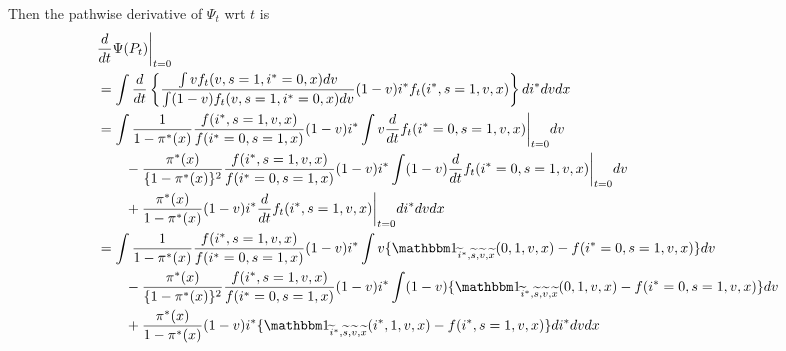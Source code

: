 \documentclass{article}
\begin{document}
Then the pathwise derivative of $\Psi_t$ wrt $t$ is
\begin{align*}
   &\frac{d}{dt} \Psi(P_t)\bigg\vert_{t=0} \\
   &= \int \frac{d}{dt} \left\{\dfrac{\int v f_t(v, s=1, i^*=0, x)dv}{\int (1-v) f_t(v, s=1, i^*=0, x)dv} (1 - v)i^*f_t(i^*, s=1, v, x) \right\} di^* dv dx \\
   &= \int \dfrac{1}{1-\pi^*(x)} \dfrac{f(i^*, s=1, v, x)}{f(i^*=0, s=1, x)} (1 - v)i^* \int v \frac{d}{dt} f_t(i^*=0, s=1,v,x) \bigg\vert_{t=0} dv \\
   &\qquad - \dfrac{\pi^*(x)}{\{1 - \pi^*(x)\}^2} \dfrac{f(i^*, s=1, v, x)}{f(i^*=0, s=1, x)} (1 - v)i^* \int (1-v) \frac{d}{dt}f_t(i^*=0, s=1, v, x) \bigg\vert_{t=0} dv \\
   &\qquad + \dfrac{\pi^*(x)}{1-\pi^*(x)} (1 - v)i^* \frac{d}{dt} f_t(i^*, s=1, v, x) \bigg\vert_{t=0} di^*dvdx \\
   &= \int  \dfrac{1}{1-\pi^*(x)} \dfrac{f(i^*, s=1, v, x)}{f(i^*=0, s=1, x)} (1 - v)i^* \int v \{ \mathbbm 1_{\widetilde i^*, \widetilde s, \widetilde v, \widetilde x}(0, 1, v, x) - f(i^*=0, s=1,v,x) \} dv \\
   &\qquad -\dfrac{\pi^*(x)}{\{1 - \pi^*(x)\}^2} \dfrac{f(i^*, s=1, v, x)}{f(i^*=0, s=1, x)} (1 - v)i^* \int (1 - v) \{\mathbbm 1_{\widetilde i^*, \widetilde s, \widetilde v, \widetilde x}(0, 1, v, x) - f(i^*=0, s=1, v, x) \} dv \\
   &\qquad + \dfrac{\pi^*(x)}{1-\pi^*(x)} (1 - v)i^* \{\mathbbm 1_{\widetilde i^*, \widetilde s, \widetilde v, \widetilde x}(i^*, 1, v, x) - f(i^*, s=1,v,x)\} di^*dvdx \\

\end{align*}
\end{document}
